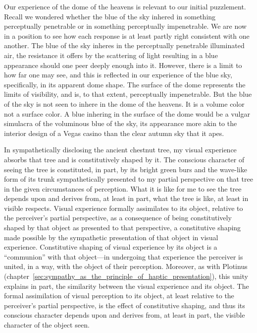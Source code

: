 Our experience of the dome of the heavens is relevant to our initial puzzlement. Recall we wondered whether the blue of the sky inhered in something perceptually penetrable or in something perceptually impenetrable. We are now in a position to see how each response is at least partly right consistent with one another. The blue of the sky inheres in the perceptually penetrable illuminated air, the resistance it offers by the scattering of light resulting in a blue appearance should one peer deeply enough into it. However, there is a limit to how far one may see, and this is reflected in our experience of the blue sky, specifically, in its apparent dome shape. The surface of the dome represents the limits of visibility, and is, to that extent, perceptually impenetrable. But the blue of the sky is not seen to inhere in the dome of the heavens. It is a volume color not a surface color. A blue inhering in the surface of the dome would be a vulgar simulacra of the voluminous blue of the sky, its appearance more akin to the interior design of a Vegas casino than the clear autumn sky that it apes.


In sympathetically disclosing the ancient chestnut tree, my visual experience absorbs that tree and is constitutively shaped by it. The conscious character of seeing the tree is constituted, in part, by its bright green burs and the wave-like form of its trunk sympathetically presented to my partial perspective on that tree in the given circumstances of perception. What it is like for me to see the tree depends upon and derives from, at least in part, what the tree is like, at least in visible respects. Visual experience formally assimilates to its object, relative to the perceiver's partial perspective, as a consequence of being constitutively shaped by that object as presented to that perspective, a constitutive shaping made possible by the sympathetic presentation of that object in visual experience. Constitutive shaping of visual experience by its object is a ``communion'' with that object---in undergoing that experience the perceiver is united, in a way, with the object of their perception. Moreover, as with Plotinus (chapter~\ref{sec:sympathy_as_the_principle_of_haptic_presentation}), this unity explains in part, the similarity between the visual experience and its object. The formal assimilation of visual perception to its object, at least relative to the perceiver's partial perspective, is the effect of constitutive shaping, and thus its conscious character depends upon and derives from, at least in part, the visible character of the object seen.

